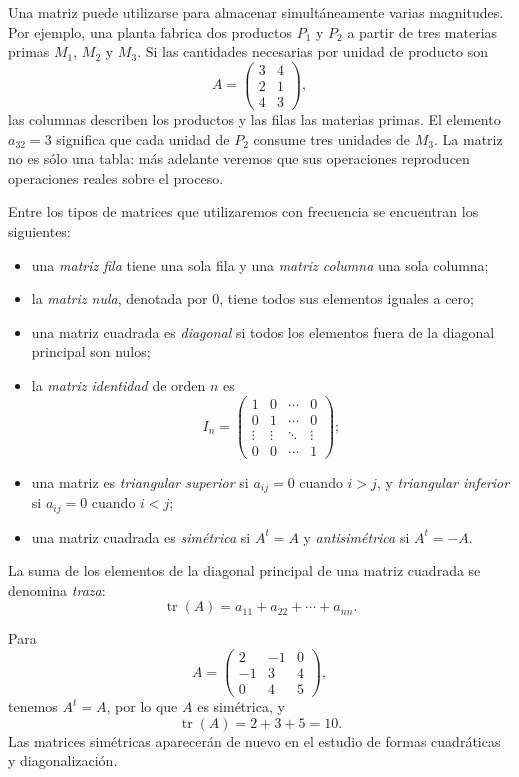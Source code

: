 Una matriz puede utilizarse para almacenar simultáneamente varias magnitudes. Por ejemplo, una planta fabrica dos productos $P_1$ y $P_2$ a partir de tres materias primas $M_1$, $M_2$ y $M_3$. Si las cantidades necesarias por unidad de producto son
\[
A=
\begin{pmatrix}
3&4\\
2&1\\
4&3
\end{pmatrix},
\]
las columnas describen los productos y las filas las materias primas. El elemento $a_{32}=3$ significa que cada unidad de $P_2$ consume tres unidades de $M_3$. La matriz no es sólo una tabla: más adelante veremos que sus operaciones reproducen operaciones reales sobre el proceso.

Entre los tipos de matrices que utilizaremos con frecuencia se encuentran los siguientes:

\begin{itemize}
\item una \emph{matriz fila} tiene una sola fila y una \emph{matriz columna} una sola columna;
\item la \emph{matriz nula}, denotada por $0$, tiene todos sus elementos iguales a cero;
\item una matriz cuadrada es \emph{diagonal} si todos los elementos fuera de la diagonal principal son nulos;
\item la \emph{matriz identidad} de orden $n$ es
\[
I_n=\begin{pmatrix}
1&0&\cdots&0\\
0&1&\cdots&0\\
\vdots&\vdots&\ddots&\vdots\\
0&0&\cdots&1
\end{pmatrix};
\]
\item una matriz es \emph{triangular superior} si $a_{ij}=0$ cuando $i>j$, y \emph{triangular inferior} si $a_{ij}=0$ cuando $i<j$;
\item una matriz cuadrada es \emph{simétrica} si $A^t=A$ y \emph{antisimétrica} si $A^t=-A$.
\end{itemize}

La suma de los elementos de la diagonal principal de una matriz cuadrada se denomina \emph{traza}:
\[
\operatorname{tr}(A)=a_{11}+a_{22}+\cdots+a_{nn}.
\]

\begin{example}
Para
\[
A=
\begin{pmatrix}
2&-1&0\\
-1&3&4\\
0&4&5
\end{pmatrix},
\]
tenemos $A^t=A$, por lo que $A$ es simétrica, y
\[
\operatorname{tr}(A)=2+3+5=10.
\]
Las matrices simétricas aparecerán de nuevo en el estudio de formas cuadráticas y diagonalización.
\end{example}

